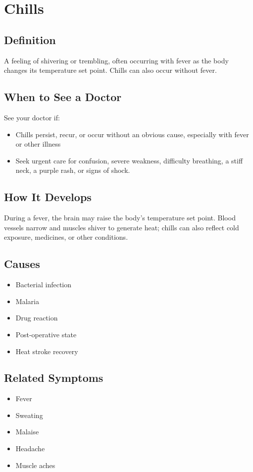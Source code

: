 \chapter{Chills}

\section*{Definition}
A feeling of shivering or trembling, often occurring with fever as the body changes its temperature set point. Chills can also occur without fever.

\section*{When to See a Doctor}
See your doctor if:
\begin{itemize}
  \item Chills persist, recur, or occur without an obvious cause, especially with fever or other illness
  \item Seek urgent care for confusion, severe weakness, difficulty breathing, a stiff neck, a purple rash, or signs of shock.
\end{itemize}

\section*{How It Develops}
During a fever, the brain may raise the body's temperature set point. Blood vessels narrow and muscles shiver to generate heat; chills can also reflect cold exposure, medicines, or other conditions.

\section*{Causes}
\begin{itemize}
  \item Bacterial infection
  \item Malaria
  \item Drug reaction
  \item Post-operative state
  \item Heat stroke recovery
\end{itemize}

\section*{Related Symptoms}
\begin{itemize}
  \item Fever
  \item Sweating
  \item Malaise
  \item Headache
  \item Muscle aches
\end{itemize}

